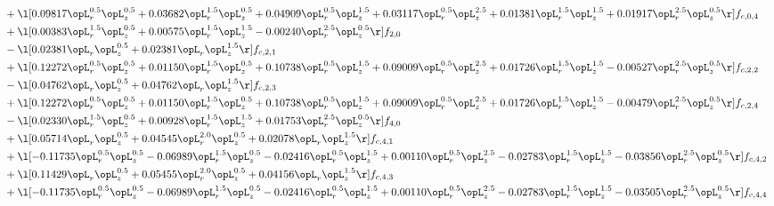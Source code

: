\begin{alignat}{2}
& + \l[  0.09817 \opL_r^{0.5} \opL_z^{0.5} +  0.03682 \opL_r^{1.5} \opL_z^{0.5} +  0.04909 \opL_r^{0.5} \opL_z^{1.5} +  0.03117 \opL_r^{0.5} \opL_z^{2.5} +  0.01381 \opL_r^{1.5} \opL_z^{1.5} +  0.01917 \opL_r^{2.5} \opL_z^{0.5}  \r] f_{c,0,4} \nonumber \\ 
& + \l[  0.00383 \opL_r^{1.5} \opL_z^{0.5} +  0.00575 \opL_r^{1.5} \opL_z^{1.5}   -0.00240 \opL_r^{2.5} \opL_z^{0.5}  \r] f_{2,0} \nonumber \\ 
& - \l[  0.02381 \opL_r \opL_z^{0.5} +  0.02381 \opL_r \opL_z^{1.5}  \r] f_{c,2,1} \nonumber \\ 
& + \l[  0.12272 \opL_r^{0.5} \opL_z^{0.5} +  0.01150 \opL_r^{1.5} \opL_z^{0.5} +  0.10738 \opL_r^{0.5} \opL_z^{1.5} +  0.09009 \opL_r^{0.5} \opL_z^{2.5} +  0.01726 \opL_r^{1.5} \opL_z^{1.5}   -0.00527 \opL_r^{2.5} \opL_z^{0.5}  \r] f_{c,2,2} \nonumber \\ 
& - \l[  0.04762 \opL_r \opL_z^{0.5} +  0.04762 \opL_r \opL_z^{1.5}  \r] f_{c,2,3} \nonumber \\ 
& + \l[  0.12272 \opL_r^{0.5} \opL_z^{0.5} +  0.01150 \opL_r^{1.5} \opL_z^{0.5} +  0.10738 \opL_r^{0.5} \opL_z^{1.5} +  0.09009 \opL_r^{0.5} \opL_z^{2.5} +  0.01726 \opL_r^{1.5} \opL_z^{1.5}   -0.00479 \opL_r^{2.5} \opL_z^{0.5}  \r] f_{c,2,4} \nonumber \\ 
& - \l[  0.02330 \opL_r^{1.5} \opL_z^{0.5} +  0.00928 \opL_r^{1.5} \opL_z^{1.5} +  0.01753 \opL_r^{2.5} \opL_z^{0.5}  \r] f_{4,0} \nonumber \\ 
& + \l[  0.05714 \opL_r \opL_z^{0.5} +  0.04545 \opL_r^{2.0} \opL_z^{0.5} +  0.02078 \opL_r \opL_z^{1.5}  \r] f_{c,4,1} \nonumber \\ 
& + \l[  -0.11735 \opL_r^{0.5} \opL_z^{0.5}   -0.06989 \opL_r^{1.5} \opL_z^{0.5}   -0.02416 \opL_r^{0.5} \opL_z^{1.5} +  0.00110 \opL_r^{0.5} \opL_z^{2.5}   -0.02783 \opL_r^{1.5} \opL_z^{1.5}   -0.03856 \opL_r^{2.5} \opL_z^{0.5}  \r] f_{c,4,2} \nonumber \\ 
& + \l[  0.11429 \opL_r \opL_z^{0.5} +  0.05455 \opL_r^{2.0} \opL_z^{0.5} +  0.04156 \opL_r \opL_z^{1.5}  \r] f_{c,4,3} \nonumber \\ 
& + \l[  -0.11735 \opL_r^{0.5} \opL_z^{0.5}   -0.06989 \opL_r^{1.5} \opL_z^{0.5}   -0.02416 \opL_r^{0.5} \opL_z^{1.5} +  0.00110 \opL_r^{0.5} \opL_z^{2.5}   -0.02783 \opL_r^{1.5} \opL_z^{1.5}   -0.03505 \opL_r^{2.5} \opL_z^{0.5}  \r] f_{c,4,4} \nonumber \\ 
\end{alignat} 


